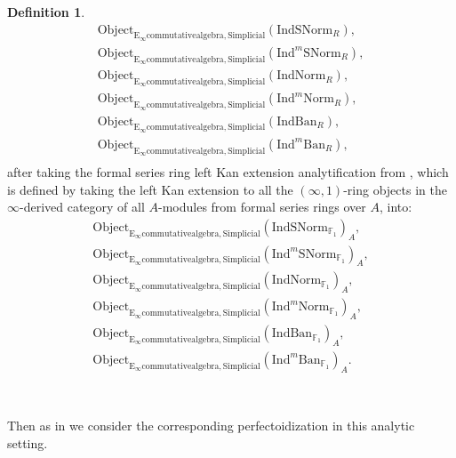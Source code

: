 \documentclass[11pt]{book}
\theoremstyle{definition}
\newtheorem{definition}[theorem]{Definition}
\numberwithin{equation}{section}
\begin{document}
\begin{definition}
\begin{align}
\mathrm{Object}_{\mathrm{E}_\infty\mathrm{commutativealgebra},\mathrm{Simplicial}}(\mathrm{IndSNorm}_R),\\
\mathrm{Object}_{\mathrm{E}_\infty\mathrm{commutativealgebra},\mathrm{Simplicial}}(\mathrm{Ind}^m\mathrm{SNorm}_R),\\
\mathrm{Object}_{\mathrm{E}_\infty\mathrm{commutativealgebra},\mathrm{Simplicial}}(\mathrm{IndNorm}_R),\\
\mathrm{Object}_{\mathrm{E}_\infty\mathrm{commutativealgebra},\mathrm{Simplicial}}(\mathrm{Ind}^m\mathrm{Norm}_R),\\
\mathrm{Object}_{\mathrm{E}_\infty\mathrm{commutativealgebra},\mathrm{Simplicial}}(\mathrm{IndBan}_R),\\
\mathrm{Object}_{\mathrm{E}_\infty\mathrm{commutativealgebra},\mathrm{Simplicial}}(\mathrm{Ind}^m\mathrm{Ban}_R),\\
\end{align}
after taking the formal series ring left Kan extension analytification from \cite[Section 4.2]{BBM}, which is defined by taking the left Kan extension to all the $(\infty,1)$-ring objects in the $\infty$-derived category of all $A$-modules from formal series rings over $A$, into:
\begin{align}
\mathrm{Object}_{\mathrm{E}_\infty\mathrm{commutativealgebra},\mathrm{Simplicial}}(\mathrm{IndSNorm}_{\mathbb{F}_1})_A,\\
\mathrm{Object}_{\mathrm{E}_\infty\mathrm{commutativealgebra},\mathrm{Simplicial}}(\mathrm{Ind}^m\mathrm{SNorm}_{\mathbb{F}_1})_A,\\
\mathrm{Object}_{\mathrm{E}_\infty\mathrm{commutativealgebra},\mathrm{Simplicial}}(\mathrm{IndNorm}_{\mathbb{F}_1})_A,\\
\mathrm{Object}_{\mathrm{E}_\infty\mathrm{commutativealgebra},\mathrm{Simplicial}}(\mathrm{Ind}^m\mathrm{Norm}_{\mathbb{F}_1})_A,\\
\mathrm{Object}_{\mathrm{E}_\infty\mathrm{commutativealgebra},\mathrm{Simplicial}}(\mathrm{IndBan}_{\mathbb{F}_1})_A,\\
\mathrm{Object}_{\mathrm{E}_\infty\mathrm{commutativealgebra},\mathrm{Simplicial}}(\mathrm{Ind}^m\mathrm{Ban}_{\mathbb{F}_1})_A.
\end{align}
\end{definition}

\

\indent Then as in \cite[Definition 8.2]{12BS} we consider the corresponding perfectoidization in this analytic setting. 
\end{document}
